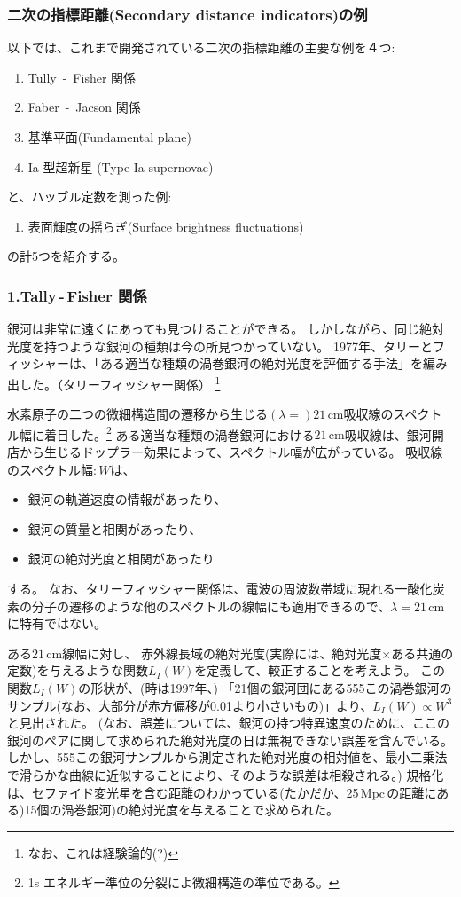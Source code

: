 \documentclass[11pt,a4paper,dvipdfmx]{jsarticle}
\theoremstyle{plain}
\theoremstyle{break}
\begin{document}
\subsubsection{二次の指標距離(Secondary distance indicators)の例}
以下では、これまで開発されている二次の指標距離の主要な例を４つ:
\begin{enumerate}
  \item Tully \,-\, Fisher 関係
  \item Faber \,-\, Jacson 関係
  \item 基準平面(Fundamental plane)
  \item Ia 型超新星 (Type Ia supernovae)
\end{enumerate}
と、ハッブル定数を測った例:
\begin{enumerate}[4]
  \item 表面輝度の揺らぎ(Surface brightness fluctuations)
\end{enumerate}
の計5つを紹介する。

\subsubsection*{1.Tally\,-\,Fisher 関係}
銀河は非常に遠くにあっても見つけることができる。
しかしながら、同じ絶対光度を持つような銀河の種類は今の所見つかっていない。
1977年、タリーとフィッシャーは、「ある適当な種類の渦巻銀河の絶対光度を評価する手法」を編み出した。（タリーフィッシャー関係）
\footnote{なお、これは経験論的(?)}

水素原子の二つの微細構造間の遷移から生じる$(\lambda = ) 21\,\mathrm{cm}$吸収線のスペクトル幅に着目した。\footnote{1s エネルギー準位の分裂によ微細構造の準位である。}
ある適当な種類の渦巻銀河における$21\,\mathrm{cm}$吸収線は、銀河開店から生じるドップラー効果によって、スペクトル幅が広がっている。
吸収線のスペクトル幅$:W$は、
\begin{itemize}
  \item 銀河の軌道速度の情報があったり、
  \item 銀河の質量と相関があったり、
  \item 銀河の絶対光度と相関があったり
\end{itemize}
する。
なお、タリーフィッシャー関係は、電波の周波数帯域に現れる一酸化炭素の分子の遷移のような他のスペクトルの線幅にも適用できるので、$\lambda = 21 \, \mathrm{cm}$に特有ではない。
\begin{flushleft}
\end{flushleft}
ある$21 \, \mathrm{cm}$線幅に対し、
赤外線長域の絶対光度(実際には、絶対光度$\times$ある共通の定数)を与えるような関数$L_I(W)$を定義して、較正することを考えよう。
この関数$L_I(W)$の形状が、(時は1997年、)
「21個の銀河団にある555この渦巻銀河のサンプル(なお、大部分が赤方偏移が0.01より小さいもの)」より、$L_I(W) \propto W^3$と見出された。
(なお、誤差については、銀河の持つ特異速度のために、ここの銀河のペアに関して求められた絶対光度の日は無視できない誤差を含んでいる。
しかし、555この銀河サンプルから測定された絶対光度の相対値を、最小二乗法で滑らかな曲線に近似することにより、そのような誤差は相殺される。)
規格化は、セファイド変光星を含む距離のわかっている(たかだか、25\,Mpc\,の距離にある)15個の渦巻銀河)の絶対光度を与えることで求められた。
\end{document}
